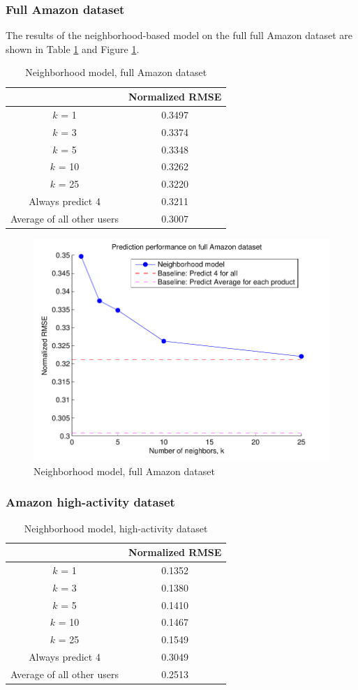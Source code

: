\documentclass[letterpaper, 10 pt, twocolumn]{article}
\begin{document}
\subsubsection{Full Amazon dataset}
The results of the neighborhood-based model on the full full Amazon dataset 
are shown in Table \ref{table:modelone_full} and Figure \ref{fig:modelone_full}.

\begin{table}[htb]
\centering
\begin{tabular}{|c|c|}
\cline{2-2}

\multicolumn{1}{c|}{}  & {Normalized RMSE} \tabularnewline \hline
$k$ = 1 & 0.3497  \tabularnewline
$k$ = 3 &  0.3374 \tabularnewline
$k$ = 5 & 0.3348  \tabularnewline
$k$ = 10 & 0.3262  \tabularnewline
$k$ = 25  & 0.3220  \tabularnewline
\hline
Always predict 4 & 0.3211 \tabularnewline 
Average of all other users & 0.3007 \tabularnewline

\hline
\end{tabular}
\caption{Neighborhood model, full Amazon dataset}
\label{table:modelone_full}
\end{table}

\begin{figure}[h]
\includegraphics[scale=0.6]{images/modelone_full.pdf}
\caption{Neighborhood model, full Amazon dataset}
\label{fig:modelone_full}
\end{figure}


\subsubsection{Amazon high-activity dataset}
\begin{table}[htb]
\centering
\begin{tabular}{|c|c|}
\cline{2-2}

\multicolumn{1}{c|}{}  & {Normalized RMSE} \tabularnewline \hline
$k$ = 1 & 0.1352  \tabularnewline
$k$ = 3 & 0.1380 \tabularnewline
$k$ = 5 &  0.1410 \tabularnewline
$k$ = 10 &  0.1467 \tabularnewline
$k$ = 25  &  0.1549 \tabularnewline
\hline
Always predict 4 & 0.3049 \tabularnewline 
Average of all other users & 0.2513 \tabularnewline
\hline
\end{tabular}
\caption{Neighborhood model, high-activity dataset}
\label{table:modelone_subset}
\end{table}
\end{document}
